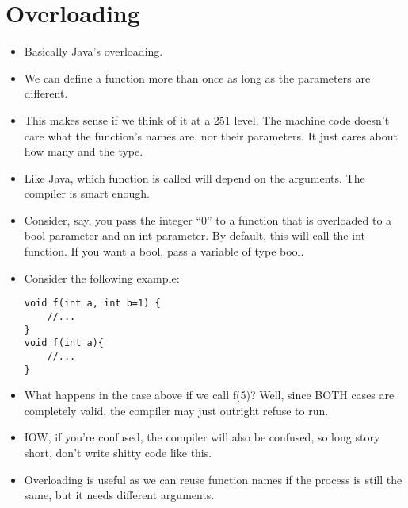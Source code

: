 \documentclass{article}
\begin{document}
\section{Overloading}
\begin{itemize}
\item Basically Java's overloading.
\item We can define a function more than once as long as the parameters are different.
\item This makes sense if we think of it at a 251 level.  The machine code doesn't care what the function's names are, nor their parameters.  It just cares about how many and the type.
\item Like Java, which function is called will depend on the arguments.  The compiler is smart enough.
\item Consider, say, you pass the integer ``0'' to a function that is overloaded to a bool parameter and an int parameter.  By default, this will call the int function.  If you want a bool, pass a variable of type bool.
\item Consider the following example:
\begin{lstlisting}
void f(int a, int b=1) {
    //...
}
void f(int a){
    //...
}
\end{lstlisting}
\item What happens in the case above if we call f(5)?  Well, since BOTH cases are completely valid, the compiler may just outright refuse to run.  
\item IOW, if you're confused, the compiler will also be confused, so long story short, don't write shitty code like this.
\item Overloading is useful as we can reuse function names if the process is still the same, but it needs different arguments.
\end{itemize}
\end{document}
